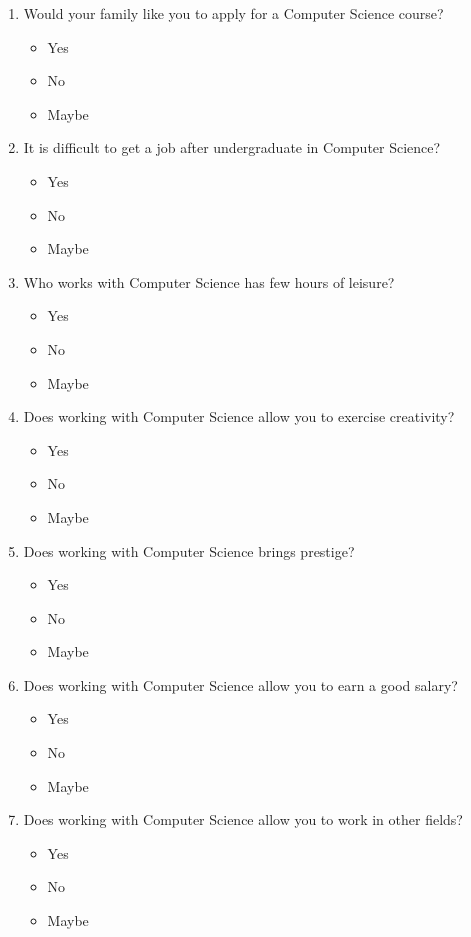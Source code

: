 \begin{enumerate}
\begin{itemize}
		\end{itemize}		
	\item Would your family like you to apply for a Computer Science course?
		\begin{itemize}
			\item Yes
			\item No
			\item Maybe
		\end{itemize}				
	\item It is difficult to get a job after undergraduate in Computer Science?
		\begin{itemize}
			\item Yes
			\item No
			\item Maybe
		\end{itemize}		
	\item Who works with Computer Science has few hours of leisure?
		\begin{itemize}
			\item Yes
			\item No
			\item Maybe
		\end{itemize}	
	\item Does working with Computer Science allow you to exercise creativity?
		\begin{itemize}
			\item Yes
			\item No
			\item Maybe
		\end{itemize}
	\item Does working with Computer Science brings prestige?
		\begin{itemize}
			\item Yes
			\item No
			\item Maybe
		\end{itemize}	
	\item Does working with Computer Science allow you to earn a good salary?
		\begin{itemize}
			\item Yes
			\item No
			\item Maybe
		\end{itemize}
	\item Does working with Computer Science allow you to work in other fields?
		\begin{itemize}
			\item Yes
			\item No
			\item Maybe
		\end{itemize}									
\end{enumerate}

